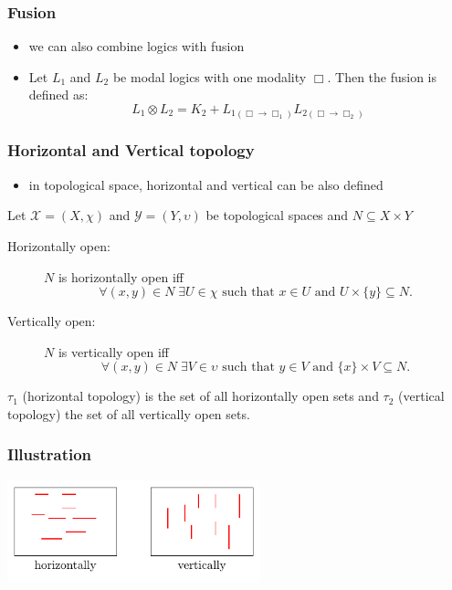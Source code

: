 \documentclass[hyperref={pdfpagelabels=false},t,10pt]{beamer}
\begin{document}
\begin{frame}
  \frametitle{Fusion}
  \begin{itemize}
    \item we can also combine logics with fusion
    \item Let $L_1$ and $L_2$ be modal logics with one modality $\Box$. Then the fusion is defined as:
    $$ L_1 \otimes L_2 = K_2 + L_{1(\Box \rightarrow \Box_1)} L_{2(\Box \rightarrow \Box_2)} $$ 

  \end{itemize}

\end{frame}

\begin{frame}
  \frametitle{Horizontal and Vertical topology}
  \begin{itemize}
    \item in topological space, horizontal and vertical can be also defined 
  \end{itemize}
  Let \( \mathcal{X} = (X, \chi) \) and \( \mathcal{Y} = (Y, \upsilon) \) be topological spaces and \( N \subseteq X \times Y \) \newline

\begin{description}
  \item[Horizontally open:] \(N\) is horizontally open iff 
  \[
    \forall (x, y) \in N\; \exists U \in \chi \text{ such that } x \in U \text{ and } U \times \{y\} \subseteq N.
  \]

  \item[Vertically open:] \(N\) is vertically open iff 
  \[
    \forall (x, y) \in N\; \exists V \in \upsilon \text{ such that } y \in V \text{ and } \{x\} \times V \subseteq N.
  \]

\end{description}

$\tau_1$ (horizontal topology) is the set of all horizontally open sets and $\tau_2$ (vertical topology) the set of all vertically open sets.


\end{frame}

\begin{frame}
  \frametitle{Illustration}
    \centering
    \includegraphics[width=0.55\textwidth]{Example4.pdf}

\end{frame}
\end{document}
